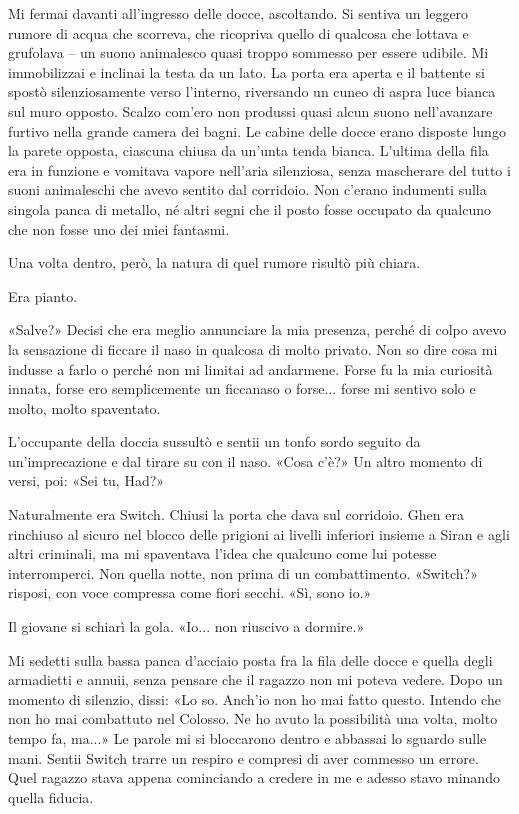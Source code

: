 Mi fermai davanti all'ingresso delle docce, ascoltando. Si sentiva un
leggero rumore di acqua che scorreva, che ricopriva quello di qualcosa
che lottava e grufolava -- un suono animalesco quasi troppo sommesso per
essere udibile. Mi immobilizzai e inclinai la testa da un lato. La porta
era aperta e il battente si spostò silenziosamente verso l'interno,
riversando un cuneo di aspra luce bianca sul muro opposto. Scalzo
com'ero non produssi quasi alcun suono nell'avanzare furtivo nella
grande camera dei bagni. Le cabine delle docce erano disposte lungo la
parete opposta, ciascuna chiusa da un'unta tenda bianca. L'ultima della
fila era in funzione e vomitava vapore nell'aria silenziosa, senza
mascherare del tutto i suoni animaleschi che avevo sentito dal
corridoio. Non c'erano indumenti sulla singola panca di metallo, né
altri segni che il posto fosse occupato da qualcuno che non fosse uno
dei miei fantasmi.

Una volta dentro, però, la natura di quel rumore risultò più chiara.

Era pianto.

«Salve?» Decisi che era meglio annunciare la mia presenza, perché di
colpo avevo la sensazione di ficcare il naso in qualcosa di molto
privato. Non so dire cosa mi indusse a farlo o perché non mi limitai ad
andarmene. Forse fu la mia curiosità innata, forse ero semplicemente un
ficcanaso o forse... forse mi sentivo solo e molto, molto spaventato.

L'occupante della doccia sussultò e sentii un tonfo sordo seguito da
un'imprecazione e dal tirare su con il naso. «Cosa c'è?» Un altro
momento di versi, poi: «Sei tu, Had?»

Naturalmente era Switch. Chiusi la porta che dava sul corridoio. Ghen
era rinchiuso al sicuro nel blocco delle prigioni ai livelli inferiori
insieme a Siran e agli altri criminali, ma mi spaventava l'idea che
qualcuno come lui potesse interromperci. Non quella notte, non prima di
un combattimento. «Switch?» risposi, con voce compressa come fiori
secchi. «Sì, sono io.»

Il giovane si schiarì la gola. «Io... non riuscivo a dormire.»

Mi sedetti sulla bassa panca d'acciaio posta fra la fila delle docce e
quella degli armadietti e annuii, senza pensare che il ragazzo non mi
poteva vedere. Dopo un momento di silenzio, dissi: «Lo so. Anch'io non
ho mai fatto questo. Intendo che non ho mai combattuto nel Colosso. Ne
ho avuto la possibilità una volta, molto tempo fa, ma...» Le parole mi
si bloccarono dentro e abbassai lo sguardo sulle mani. Sentii Switch
trarre un respiro e compresi di aver commesso un errore. Quel ragazzo
stava appena cominciando a credere in me e adesso stavo minando quella
fiducia.

